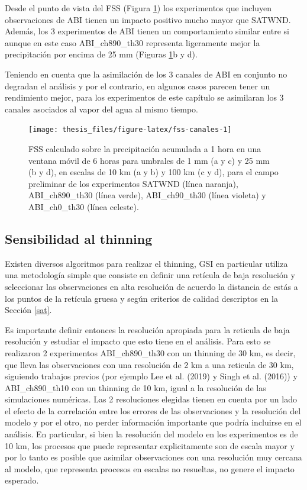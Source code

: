 \documentclass[12pt,oneside,a4paper]{reedthesis}
\begin{document}
Desde el punto de vista del FSS (Figura \ref{fig:fss-canales}) los experimentos que incluyen observaciones de ABI tienen un impacto positivo mucho mayor que SATWND. Además, los 3 experimentos de ABI tienen un comportamiento similar entre si aunque en este caso ABI\_ch890\_th30 representa ligeramente mejor la precipitación por encima de 25 mm (Figuras \ref{fig:fss-canales}b y d).

Teniendo en cuenta que la asimilación de los 3 canales de ABI en conjunto no degradan el análisis y por el contrario, en algunos casos parecen tener un rendimiento mejor, para los experimentos de este capítulo se asimilaran los 3 canales asociados al vapor del agua al mismo tiempo.


\begin{figure}
\texttt{[image: thesis\_files/figure-latex/fss-canales-1]} \caption{FSS calculado sobre la precipitación acumulada a 1 hora en una ventana móvil de 6 horas para umbrales de 1 mm (a y c) y 25 mm (b y d), en escalas de 10 km (a y b) y 100 km (c y d), para el campo preliminar de los experimentos SATWND (línea naranja), ABI\_ch890\_th30 (línea verde), ABI\_ch90\_th30 (línea violeta) y ABI\_ch0\_th30 (línea celeste).}\label{fig:fss-canales}
\end{figure}
\hypertarget{thinning}{%
\subsection{Sensibilidad al thinning}\label{thinning}}

Existen diversos algoritmos para realizar el thinning, GSI en particular utiliza una metodología simple que consiste en definir una retícula de baja resolución y seleccionar las observaciones en alta resolución de acuerdo la distancia de estás a los puntos de la retícula gruesa y según criterios de calidad descriptos en la Sección \ref{sat}.

Es importante definir entonces la resolución apropiada para la reticula de baja resolución y estudiar el impacto que esto tiene en el análisis. Para esto se realizaron 2 experimentos ABI\_ch890\_th30 con un thinning de 30 km, es decir, que lleva las observaciones con una resolución de 2 km a una reticula de 30 km, siguiendo trabajos previos (por ejemplo Lee et al. (2019) y Singh et al. (2016)) y ABI\_ch890\_th10 con un thinning de 10 km, igual a la resolución de las simulaciones numéricas. Las 2 resoluciones elegidas tienen en cuenta por un lado el efecto de la correlación entre los errores de las observaciones y la resolución del modelo y por el otro, no perder información importante que podría incluirse en el análisis. En particular, si bien la resolución del modelo en los experimentos es de 10 km, los procesos que puede representar explicitamente son de escala mayor y por lo tanto es posible que asimilar observaciones con una resolución muy cercana al modelo, que representa procesos en escalas no resueltas, no genere el impacto esperado.
\end{document}
